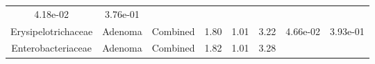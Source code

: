 \documentclass[12pt,]{article}
\begin{document}
\begin{longtable}[]{@{}cccccccc@{}}
\begin{minipage}[t]{0.06\columnwidth}
4.18e-02\strut
\end{minipage} & \begin{minipage}[t]{0.06\columnwidth}\centering\strut
3.76e-01\strut
\end{minipage}\tabularnewline
\begin{minipage}[t]{0.19\columnwidth}\centering\strut
Erysipelotrichaceae\strut
\end{minipage} & \begin{minipage}[t]{0.07\columnwidth}\centering\strut
Adenoma\strut
\end{minipage} & \begin{minipage}[t]{0.09\columnwidth}\centering\strut
Combined\strut
\end{minipage} & \begin{minipage}[t]{0.03\columnwidth}\centering\strut
1.80\strut
\end{minipage} & \begin{minipage}[t]{0.14\columnwidth}\centering\strut
1.01\strut
\end{minipage} & \begin{minipage}[t]{0.14\columnwidth}\centering\strut
3.22\strut
\end{minipage} & \begin{minipage}[t]{0.06\columnwidth}\centering\strut
4.66e-02\strut
\end{minipage} & \begin{minipage}[t]{0.06\columnwidth}\centering\strut
3.93e-01\strut
\end{minipage}\tabularnewline
\begin{minipage}[t]{0.19\columnwidth}\centering\strut
Enterobacteriaceae\strut
\end{minipage} & \begin{minipage}[t]{0.07\columnwidth}\centering\strut
Adenoma\strut
\end{minipage} & \begin{minipage}[t]{0.09\columnwidth}\centering\strut
Combined\strut
\end{minipage} & \begin{minipage}[t]{0.03\columnwidth}\centering\strut
1.82\strut
\end{minipage} & \begin{minipage}[t]{0.14\columnwidth}\centering\strut
1.01\strut
\end{minipage} & \begin{minipage}[t]{0.14\columnwidth}\centering\strut
3.28\strut
\end{minipage} & \begin{minipage}[t]{0.06\columnwidth}\centering\strut

\end{minipage}
\end{longtable}
\end{document}
